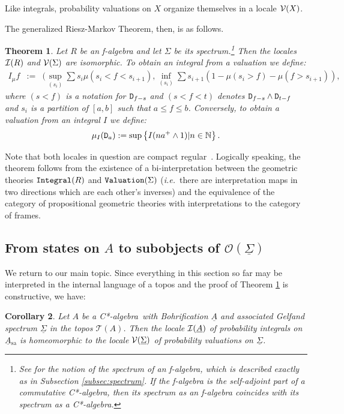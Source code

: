 \documentclass[11pt]{article}
\newcommand{\assign}{:=}
\newcommand{\ca}{C*-algebra} \newcommand{\jba}{JB-algebra}
\newcommand{\Sg}{\Sigma} \newcommand{\ta}{\tau} \newcommand{\ph}{\phi}
\newcommand{\alg}[1]{\ensuremath{#1}}
\newcommand{\functor}[1]{\ensuremath{\underline{#1}}}
\newcommand{\asstopos}{\ensuremath{\mathcal{T}}}
\newcommand{\sa}{\ensuremath{_{\mathrm{sa}}}}
\newcommand{\prop}[1]{\ensuremath{\mbox{\texttt{#1}}}}
\newcommand{\uS}{\underline{\Sigma}}
\newcommand{\uA}{\underline{A}}
\newcommand{\TA}{\mathcal{T}(A)}
\newcommand{\ie}{\textit{i.e.}}
\newcommand{\ulS}{\functor{\Sigma}}
\newcommand{\ulA}{\underline{A}}
\renewcommand{\TA}{\asstopos(\alg{A})}
\newtheorem{theorem}{Theorem}
\newtheorem{corollary}[theorem]{Corollary}
\begin{document}
Like integrals, probability valuations on $X$ organize themselves in a locale
${\mathcal V}(X)$.

The generalized Riesz-Markov Theorem, then, is as follows.
\begin{theorem}
\label{thm:CSI}
  {\normalfont\textbf{\cite{Coquand/Spitters:integrals-valuations}}}
  Let $R$ be an f-algebra and let $\Sigma$ be its
  spectrum.\footnote{See \cite{coquand05} for the notion of the
  spectrum of an f-algebra, which is described exactly as in
  Subsection \ref{subsec:spectrum}. If the f-algebra is the
  self-adjoint part of a commutative C*-algebra, then its spectrum as
  an f-algebra coincides with  its spectrum as a \ca.}
  Then
the locales ${\mathcal I}(R)$ and ${\mathcal V}(\Sigma)$
  are isomorphic. To obtain an integral from a valuation we define:
\[\begin{array}{lll}
  I_{\mu} f & \assign & (\sup_{(s_i)} \sum s_i \mu (s_i < f < s_{i+1}),
  \inf_{(s_i)} \sum s_{i + 1} (1-\mu (s_i > f) - \mu (f > s_{i+1})),
\end{array}\]
where $(s<f)$ is a notation for $\prop{D}_{f-s}$ and
$(s<f<t)$ denotes $\prop{D}_{f-s}\wedge \prop{D}_{t-f}$ and $s_i$ is a partition
of
$[a,b]$ such that $a\leqslant f\leqslant b$.
Conversely, to obtain a valuation from an integral $I$ we define:
\[\mu_I (\prop{D}_a) := \sup \left\{ I (n a^+ \wedge 1) | n \in \mathbb{N}
\right\}.\]

\end{theorem}
Note that  both locales in question are compact
regular~\cite{Coquand/Spitters:integrals-valuations}. Logically
speaking, the theorem follows from the existence of a
 bi-interpretation between the geometric theories $\prop{Integral}(R)$
and $\prop{Valuation}(\Sg)$  (\ie\ there are interpretation maps in two
directions which are each other's inverses) and the equivalence of
the category of
propositional geometric theories with interpretations
to the category of frames.

\subsection{From states on $A$ to subobjects of $\mathcal{O}(\ulS)$}\label{SSS}

We return to our main topic. Since everything in this section so far may be
interpreted in the internal language of a topos and the proof of Theorem
\ref{thm:CSI} is constructive, we have:
\begin{corollary}\label{thm:11}
  Let $A$ be a \ca\ with Bohrification $\ulA$ and associated Gelfand
  spectrum $\uS$ in the topos $\TA$. Then the locale $\CI(\ulA)$ of
  probability integrals on $\uA\sa$ is homeomorphic to the locale
  $\CV(\ulS)$ of probability valuations on $\ulS$.
\end{corollary}
\end{document}
